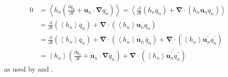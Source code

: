 \documentclass[12pt,a4paper]{report}
\newcommand*\thkmean[1]{\overline{#1}}
\newcommand*\thkres[1]{{#1}^{\prime}}
\newcommand*\nthkmean[1]{\left\langle{#1}\right\rangle}
\newcommand*{\partialdiff}[2][{}]{\frac{\partial #1}{\partial #2}}
\begin{document}
    \begin{equation}
    \begin{split}
    0&=\nthkmean{ h_{n} \left(\partialdiff[q_{n}]{t} + \boldsymbol{u}_{n} \cdot\boldsymbol{\nabla}q_{n} \right) } =
    \nthkmean{  \partialdiff{t}\left(h_{n}q_{n}\right) +  \boldsymbol{\nabla}\cdot\left(h_{n}\boldsymbol{u}_{n}q_{n} \right)}  \\
    &= \partialdiff{t} \left(\nthkmean{ h_{n} } \thkmean{q}_{n}\right)
    +  \boldsymbol{\nabla}\cdot\left( \nthkmean{ h_{n}}\thkmean{\boldsymbol{u}_{n}q_{n}} \right) \\
    &= \partialdiff{t} \left(\nthkmean{h_{n}} \thkmean{q}_{n}\right) +  \boldsymbol{\nabla}\cdot\left( \nthkmean{h_{n}} \thkmean{\boldsymbol{u}}_{n} \, \thkmean{q}_{n} \right) +  \boldsymbol{\nabla}\cdot\left( \nthkmean{h_{n}} \thkmean{\thkres{\boldsymbol{u}}_{n}\thkres{q}_{n}} \right) \\
    &= \nthkmean{h_{n}} \left(\partialdiff[\thkmean{q}_{n}]{t}+  \thkmean{\boldsymbol{u}}_{n}\cdot \boldsymbol{\nabla}\thkmean{q}_{n} \right) +  \boldsymbol{\nabla}\cdot\left( \nthkmean{h_{n}} \thkmean{\thkres{\boldsymbol{u}}_{n}\thkres{q}_{n}} \right)
    \end{split}
    \end{equation}
    as used by \cite{greatbatch1998exploring} and \cite{smith1999primitive}.
    
\end{document}
